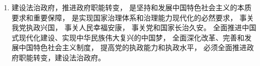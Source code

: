 \begin{enumerate}
\begin{enumerate}
                是实现国家治理体系和治理能力现代化的必然要求，
                事关我党执政兴国，
                事关人民幸福安康，
                事关党和国家长治久安。
                全面推进中国式现代化建设、实现中华民族伟大复兴的中国梦，
                全面深化改革、完善和发展中国特色社会主义制度，
                提高党的执政能力和执政水平，
                必须全面推进司法体制改革，实现司法公正。
          \item 建设法治政府，推进政府职能转变，
                是坚持和发展中国特色社会主义的本质要求和重要保障，
                是实现国家治理体系和治理能力现代化的必然要求，
                事关我党执政兴国，
                事关人民幸福安康，
                事关党和国家长治久安。
                全面推进中国式现代化建设、实现中华民族伟大复兴的中国梦，
                全面深化改革、完善和发展中国特色社会主义制度，
                提高党的执政能力和执政水平，
                必须全面推进政府职能转变，建设法治政府。
        \end{enumerate}
\end{enumerate}


